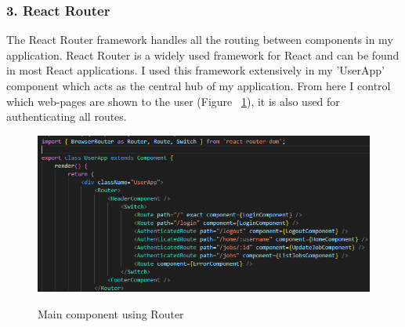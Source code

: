 \subsubsection{3. React Router}
The React Router framework handles all the routing between components in my application. React Router is a widely used framework for React and can be found in most React applications. I used this framework extensively in my 'UserApp' component which acts as the central hub of my application. From here I control which web-pages are shown to the user (Figure ~\ref{router_label}), it is also used for authenticating all routes.

\begin{figure}[h]
    \centering
    \includegraphics[scale=0.35]{Images/router.png} 
    \label{router_label}
    \caption{Main component using Router}
\end{figure}